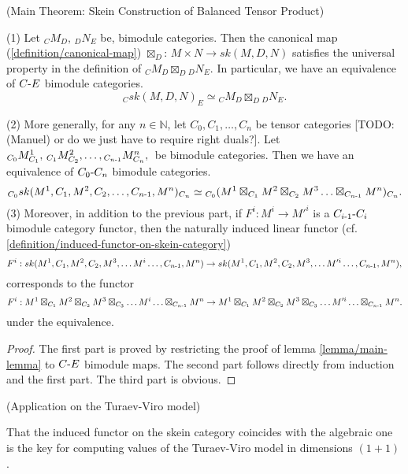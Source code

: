 \begin{theorem} (Main Theorem: Skein Construction of Balanced Tensor Product) \label{theorem/main-theorem}

  \noindent (1) Let ${}_{C}M_{D}, \, {}_{D}N_{E}$ be, bimodule categories.
  \quad Then the canonical map (\ref{definition/canonical-map})
  $\boxtimes_{D}$: $M \times N \to sk(M,D,N)$ satisfies the universal property
  in the definition of ${}_{C}M_{D} \boxtimes_{D} {}_{D}N_{E}$. In particular,
  we have an equivalence of $C{\text -}E$ bimodule categories.
  \[
    {}_{C}sk(M,D,N)_{E} \simeq {}_{C}M_{D} \boxtimes_{D} {}_{D}N_{E}.
  \]

  \noindent (2) More generally, for any $n \in \mathbb{N}$, let
  $C_{0}, C_{1}, \ldots, C_{n}$ be tensor categories [TODO: (Manuel) or do we just have to require right duals?]. Let
  ${}_{C_{0}}M^{1}_{C_{1}}, \, {}_{C_{1}}M^{2}_{C_{2}}, \ldots, {}_{C_{n{\text -}1}}M^{n}_{C_{n}}, \, $
  be bimodule categories. \quad Then we have an equivalence of
  $C_{0}{\text -}C_{n}$ bimodule categories.
  \[
    {}_{C_{0}}sk(M^{1},C_{1},M^{2},C_{2}, \ldots, C_{n{\text -}1}, M^{n})_{C_{n}}
    \simeq
    {}_{C_{0}}(M^{1}
    \boxtimes_{C_{1}}
    M^{2}
    \boxtimes_{C_{2}}
    M^{3}
    \ldots
    \boxtimes_{C_{n{\text -}1}}
    M^{n})_{C_{n}}.
  \]
  \noindent (3) Moreover, in addition to the previous part, if
  $F^{i}: M^{i} \to M'^{i}$ is a $C_{i{\text -}1}{\text -}C_{i}$ bimodule category
  functor, then the naturally induced linear functor (cf.
  \ref{definition/induced-functor-on-skein-category})
  \[
    F^{i}:
    sk(M^{1}, C_{1}, M^{2}, C_{2}, M^{3}, \ldots M^{i} \ldots, C_{n{\text -}1}, M^{n})
    \to
    sk(M^{1}, C_{1}, M^{2}, C_{2}, M^{3}, \ldots M'^{i} \ldots, C_{n{\text -}1}, M^{n}),
  \]
  corresponds to the functor
  \[
    F^{i}: M^{1} \boxtimes_{C_{1}} M^{2} \boxtimes_{C_{2}} M^{3} \boxtimes_{C_{3}} \ldots M^{i} \ldots \boxtimes_{C_{n{\text -}1}} M^{n} \to M^{1} \boxtimes_{C_{1}} M^{2} \boxtimes_{C_{2}} M^{3} \boxtimes_{C_{3}} \ldots M'^{i} \ldots \boxtimes_{C_{n{\text -}1}} M^{n}.
  \]
  under the equivalence.
\end{theorem}

\begin{proof}
  The first part is proved by restricting the proof of lemma \ref{lemma/main-lemma} to $C{\text -}E$ bimodule maps.
  The second part follows directly from induction and the first part. The third part is obvious.
\end{proof}

\begin{remark} (Application on the Turaev-Viro model)

  \noindent That the induced functor on the skein category coincides with the
  algebraic one is the key for computing values of the Turaev-Viro model in
  dimensions $(1+1)$ \cite{guu/tv-as-3-functor}.
\end{remark}

